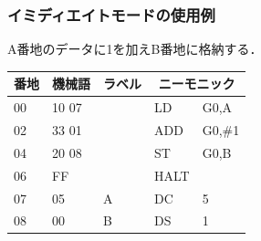 \documentclass{beamer}                 %
\begin{document}
\begin{frame}
  \frametitle{イミディエイトモードの使用例}
  A番地のデータに1を加えB番地に格納する．
  \vfill
  \begin{minipage}[]{0.58\columnwidth}
  {\small\ttfamily\begin{center}
    \begin{tabular}{|l|l|l|l l|} \hline
      {\footnotesize 番地} & {\footnotesize 機械語} &
      {\footnotesize ラベル} & \multicolumn{2}{|c|}{ニーモニック} \\
      \hline
      00 & 10 07 &   & LD   & G0,A      \\
      02 & 33 01 &   & ADD  & G0,\#1    \\
      04 & 20 08 &   & ST   & G0,B      \\
      06 & FF    &   & HALT &           \\
      07 & 05    & A & DC   & 5         \\
      08 & 00    & B & DS   & 1         \\
      \hline
    \end{tabular}
  \end{center}}
  \end{minipage}
  \begin{minipage}[b]{0.38\columnwidth}
    \vspace{1.3cm}
  \end{minipage}
  \vfill
\end{frame}
\end{document}
